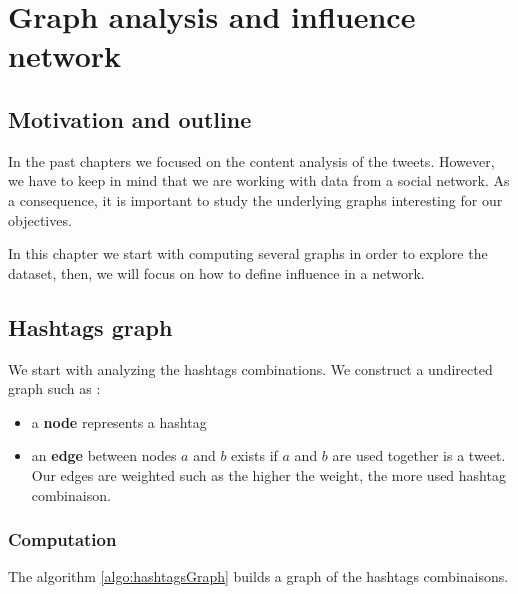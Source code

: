 \documentclass[a4paper,twoside,12pt,openright]{report}
\begin{document}

\chapter{Graph analysis and influence network}

\section{Motivation and outline}

In the past chapters we focused on the content analysis of the tweets. However, we have to keep in mind that we are working with data from a social network. As a consequence, it is important to study the underlying graphs interesting for our objectives.

In this chapter we start with computing several graphs in order to explore the dataset, then, we will focus on how to define influence in a network.

\newpage
\section{Hashtags graph}
We start with analyzing the hashtags combinations. We construct a undirected graph such as :
\begin{itemize}
\item a \textbf{node} represents a hashtag
\item an \textbf{edge} between nodes $a$ and $b$ exists if $a$ and $b$ are used together is a tweet. Our edges are weighted such as the higher the weight, the more used hashtag combinaison.
\end{itemize}

\subsection{Computation}

The algorithm \ref{algo:hashtagsGraph} builds a graph of the hashtags combinaisons.
\end{document}
